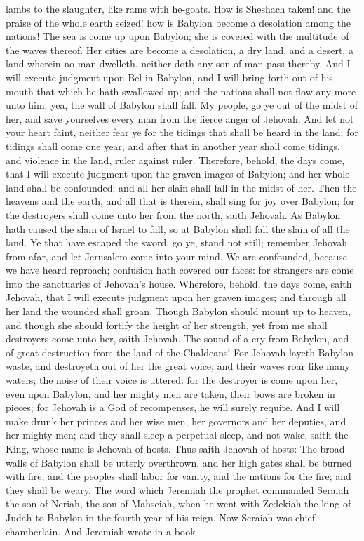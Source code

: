 lambs to the slaughter, like rams with he-goats.  How is Sheshach taken! and the praise of the whole earth seized! how is Babylon become a desolation among the nations! The sea is come up upon Babylon; she is covered with the multitude of the waves thereof. Her cities are become a desolation, a dry land, and a desert, a land wherein no man dwelleth, neither doth any son of man pass thereby. And I will execute judgment upon Bel in Babylon, and I will bring forth out of his mouth that which he hath swallowed up; and the nations shall not flow any more unto him: yea, the wall of Babylon shall fall.  My people, go ye out of the midst of her, and save yourselves every man from the fierce anger of Jehovah. And let not your heart faint, neither fear ye for the tidings that shall be heard in the land; for tidings shall come one year, and after that in another year shall come tidings, and violence in the land, ruler against ruler. Therefore, behold, the days come, that I will execute judgment upon the graven images of Babylon; and her whole land shall be confounded; and all her slain shall fall in the midst of her. Then the heavens and the earth, and all that is therein, shall sing for joy over Babylon; for the destroyers shall come unto her from the north, saith Jehovah. As Babylon hath caused the slain of Israel to fall, so at Babylon shall fall the slain of all the land.  Ye that have escaped the sword, go ye, stand not still; remember Jehovah from afar, and let Jerusalem come into your mind. We are confounded, because we have heard reproach; confusion hath covered our faces: for strangers are come into the sanctuaries of Jehovah’s house. Wherefore, behold, the days come, saith Jehovah, that I will execute judgment upon her graven images; and through all her land the wounded shall groan. Though Babylon should mount up to heaven, and though she should fortify the height of her strength, yet from me shall destroyers come unto her, saith Jehovah.  The sound of a cry from Babylon, and of great destruction from the land of the Chaldeans! For Jehovah layeth Babylon waste, and destroyeth out of her the great voice; and their waves roar like many waters; the noise of their voice is uttered: for the destroyer is come upon her, even upon Babylon, and her mighty men are taken, their bows are broken in pieces; for Jehovah is a God of recompenses, he will surely requite. And I will make drunk her princes and her wise men, her governors and her deputies, and her mighty men; and they shall sleep a perpetual sleep, and not wake, saith the King, whose name is Jehovah of hosts. Thus saith Jehovah of hosts: The broad walls of Babylon shall be utterly overthrown, and her high gates shall be burned with fire; and the peoples shall labor for vanity, and the nations for the fire; and they shall be weary.  The word which Jeremiah the prophet commanded Seraiah the son of Neriah, the son of Mahseiah, when he went with Zedekiah the king of Judah to Babylon in the fourth year of his reign. Now Seraiah was chief chamberlain. And Jeremiah wrote in a book 